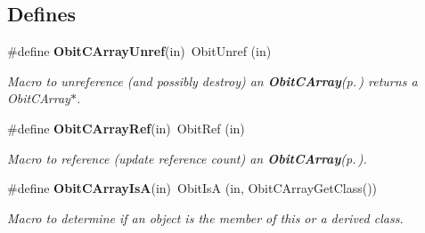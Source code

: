 \subsection*{Defines}
\begin{CompactItemize}
\item 
\#define {\bf Obit\-CArray\-Unref}(in)\ Obit\-Unref (in)
\begin{CompactList}\small\item\em Macro to unreference (and possibly destroy) an {\bf Obit\-CArray}{\rm (p.\,\pageref{structObitCArray})} returns a Obit\-CArray$\ast$. \item\end{CompactList}\item 
\#define {\bf Obit\-CArray\-Ref}(in)\ Obit\-Ref (in)
\begin{CompactList}\small\item\em Macro to reference (update reference count) an {\bf Obit\-CArray}{\rm (p.\,\pageref{structObitCArray})}. \item\end{CompactList}\item 
\#define {\bf Obit\-CArray\-Is\-A}(in)\ Obit\-Is\-A (in, Obit\-CArray\-Get\-Class())
\begin{CompactList}\small\item\em Macro to determine if an object is the member of this or a derived class. \item\end{CompactList}\end{CompactItemize}
